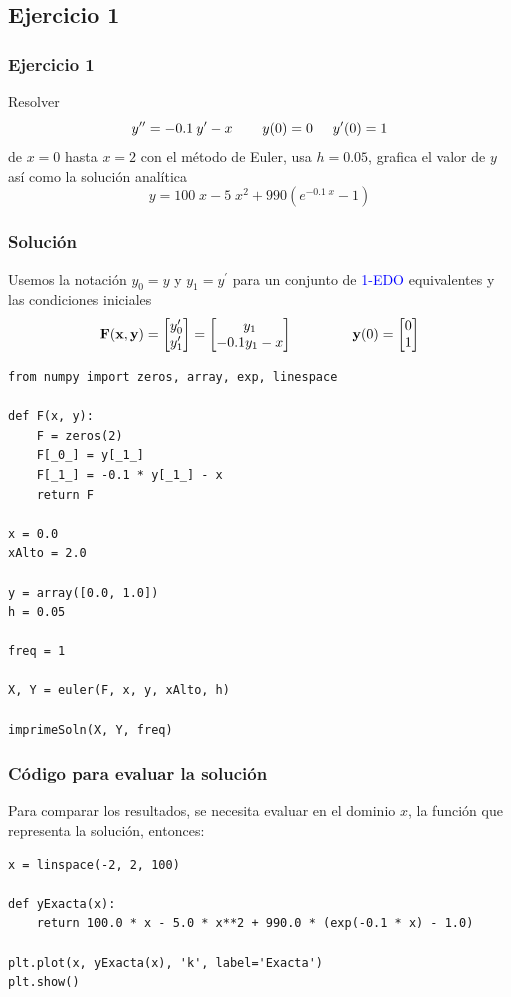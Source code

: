 \subsection{Ejercicio 1}
\begin{frame}
\frametitle{Ejercicio 1}
Resolver
\[ y^{\prime \prime} = -0.1 \: y^{\prime} - x \hspace{0.75cm} y(0) = 0 \hspace{0.5cm} y^{\prime} (0) = 1\]
de $x = 0$ hasta $x = 2$ con el método de Euler, usa $h = 0.05$, grafica el valor de $y$ así como la solución analítica
\[ y = 100 \; x - 5 \; x^{2} + 990 (e^{-0.1 \; x} - 1 ) \]
\end{frame}
\begin{frame}
\frametitle{Solución}
Usemos la notación $y_{0} = y$ y $y_{1} = y^{\prime}$ para un conjunto de \textcolor{blue}{1-EDO} equivalentes y las condiciones iniciales
\[\mathbf{F(x, y)} = 
\begin{bmatrix}
y^{\prime}_{0} \\
y^{\prime}_{1}
\end{bmatrix} =
\begin{bmatrix}
y_{1} \\
-0.1 y_{1} - x
\end{bmatrix}
\hspace{1.5cm}
\mathbf{y}(0) = 
\begin{bmatrix}
0 \\
1
\end{bmatrix} \]
\end{frame}
\begin{frame}
\begin{lstlisting}[caption=Código para el Ejercicio, style=FormattedNumber, basicstyle=\linespread{1.1}\ttfamily=\small, columns=fullflexible]
from numpy import zeros, array, exp, linespace

def F(x, y):
    F = zeros(2)
    F[_0_] = y[_1_]
    F[_1_] = -0.1 * y[_1_] - x
    return F
	
x = 0.0
xAlto = 2.0

y = array([0.0, 1.0])
h = 0.05

freq = 1

X, Y = euler(F, x, y, xAlto, h)

imprimeSoln(X, Y, freq)
\end{lstlisting}
\end{frame}
\begin{frame}
\frametitle{Código para evaluar la solución}
Para comparar los resultados, se necesita evaluar en el dominio $x$, la función que representa la solución, entonces:
\begin{lstlisting}[caption=Código que evalúa la solución, style=FormattedNumber, basicstyle=\linespread{1.1}\ttfamily=\small, columns=fullflexible]
x = linspace(-2, 2, 100)

def yExacta(x):
	return 100.0 * x - 5.0 * x**2 + 990.0 * (exp(-0.1 * x) - 1.0)

plt.plot(x, yExacta(x), 'k', label='Exacta')
plt.show()
\end{lstlisting}
\end{frame}
